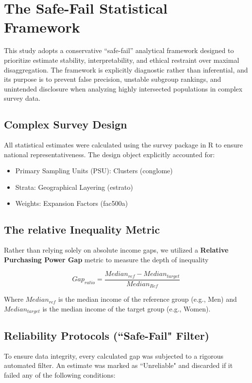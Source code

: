 \documentclass{article}
\begin{document}
\section{The Safe-Fail Statistical Framework}
This study adopts a conservative “safe-fail” analytical framework designed to prioritize estimate 
stability, interpretability, and ethical restraint over maximal disaggregation. The framework is 
explicitly diagnostic rather than inferential, and its purpose is to prevent false precision, 
unstable subgroup rankings, and unintended disclosure when analyzing highly intersected populations 
in complex survey data.

\subsection{Complex Survey Design}
All statistical estimates were calculated using the survey package in R to ensure national 
representativeness. The design object explicitly accounted for:
\begin{itemize}

    \item Primary Sampling Units (PSU): 
    Clusters (conglome)

    \item Strata: Geographical 
    Layering (estrato)

    \item Weights: Expansion 
    Factors (fac500a)

\end{itemize}
\subsection{The relative Inequality Metric}
Rather than relying solely on absolute income gaps, we utilized a \textbf{Relative Purchasing Power 
Gap} metric to measure the depth of inequality

\begin{equation*}
    Gap_{ratio}=\frac{Median_{ref}-Median_{target}}{Median_{Ref}}
\end{equation*}

Where $Median_{ref}$ is the median income of the reference group (e.g., Men) and $Median_{target}$ 
is the median income of the target group (e.g., Women).

\subsection{Reliability Protocols (``Safe-Fail" Filter)}
 To ensure data integrity, every calculated gap was subjected to a rigorous automated filter. 
 An estimate was marked as ``Unreliable" and discarded if it failed any of the following 
 conditions:
\end{document}
